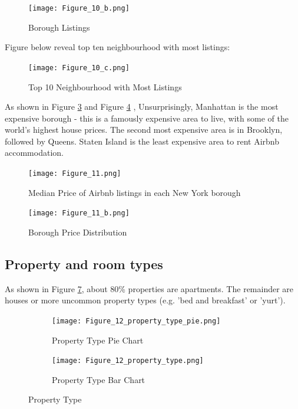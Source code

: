\begin{figure}[H] \centering
\caption{Borough Listings}
    \texttt{[image: Figure\_10\_b.png]}
    \label{fig:borough-number-of-listing}
\end{figure}

Figure below reveal top ten neighbourhood with most listings:
\begin{figure}[H] \centering
\caption{Top 10 Neighbourhood with Most Listings}
    \texttt{[image: Figure\_10\_c.png]}
    \label{fig:top-ten-most-listing-neighbourhood}
\end{figure}

As shown in Figure \ref{fig:median-price-borough} and Figure
\ref{fig:borough-price-distribution} , Unsurprisingly, Manhattan is the most
expensive borough - this is a famously expensive area to live, with some of the
world's highest house prices. The second most expensive area is in Brooklyn,
followed by Queens. Staten Island is the least expensive area to rent Airbnb
accommodation.

\begin{figure}[H]\centering
    \caption{Median Price of Airbnb listings in each New York borough}
    \texttt{[image: Figure\_11.png]}
    \label{fig:median-price-borough}
\end{figure}

\begin{figure}[H]\centering
    \caption{Borough Price Distribution}
    \texttt{[image: Figure\_11\_b.png]}
    \label{fig:borough-price-distribution}
\end{figure}

\subsection{Property and room types}

As shown in Figure \ref{fig:property_type},
about 80\% properties are apartments. The remainder are houses or more uncommon
property types (e.g. 'bed and breakfast' or 'yurt').

\begin{figure}[H]
    \centering
    \begin{subfigure}[b]{0.48\textwidth}
        \centering
        \caption{Property Type Pie Chart}
        \texttt{[image: Figure\_12\_property\_type\_pie.png]}
        \label{fig:property_type_pie}
    \end{subfigure}
    \begin{subfigure}[b]{0.48\textwidth}
        \centering
        \caption{Property Type Bar Chart}
        \texttt{[image: Figure\_12\_property\_type.png]}
        \label{fig:property_type_bar}
    \end{subfigure}

    \caption{Property Type}
    \label{fig:property_type}
\end{figure}


